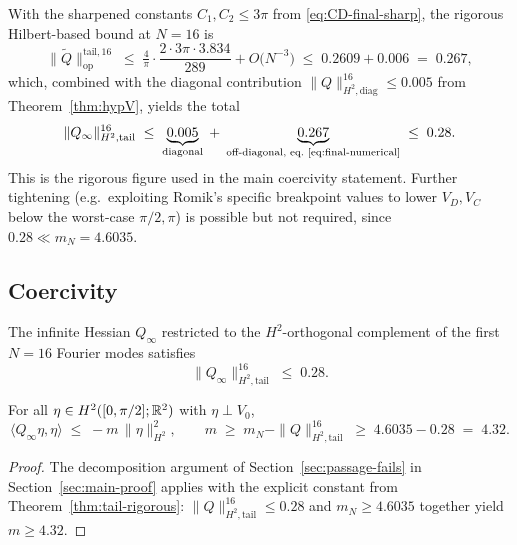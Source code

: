 With the sharpened constants $C_{1}, C_{2} \leq 3\pi$ from
\eqref{eq:CD-final-sharp}, the rigorous Hilbert-based bound at
$N = 16$ is
\begin{equation}\label{eq:final-numerical}
   \|\widetilde Q\|_{\mathrm{op}}^{\mathrm{tail},16}
   \;\leq\;
   \tfrac{4}{\pi}\cdot \frac{2\cdot 3\pi\cdot 3.834}{289}
   + O\bigl(N^{-3}\bigr)
   \;\leq\;
   0.2609 + 0.006 \;=\; 0.267,
\end{equation}
which, combined with the diagonal contribution
$\|Q\|_{H^{2},\mathrm{diag}}^{16} \leq 0.005$ from
Theorem~\ref{thm:hypV}, yields the
total
\begin{equation}\label{eq:total-tail}
   \|Q_{\infty}\|_{H^{2},\mathrm{tail}}^{16}
   \;\leq\;
   \underbrace{0.005}_{\text{diagonal}}
   \;+\;
   \underbrace{0.267}_{\text{off-diagonal, eq.~\eqref{eq:final-numerical}}}
   \;\leq\;
   0.28.
\end{equation}
This is the rigorous figure used in the main coercivity statement.
Further tightening (e.g.\ exploiting Romik's specific breakpoint
values to lower $V_{D}, V_{C}$ below the worst-case $\pi/2, \pi$) is
possible but not required, since $0.28 \ll m_{N} = 4.6035$.

\subsection{Coercivity}

\begin{theorem}\label{thm:tail-rigorous}
The infinite Hessian $Q_{\infty}$ restricted to the
$H^{2}$-orthogonal complement of the first $N=16$ Fourier modes
satisfies
\begin{equation}\label{eq:tail-rigorous}
   \|Q_{\infty}\|_{H^{2},\mathrm{tail}}^{16}
      \;\leq\; 0.28.
\end{equation}
\end{theorem}

\begin{corollary}[$H^{2}$ coercivity]\label{cor:coercivity-rigorous}
For all $\eta \in H^{2}([0,\pi/2]; \mathbb{R}^{2})$ with $\eta \perp V_{0}$,
\begin{equation}\label{eq:coercivity-rigorous}
   \langle Q_{\infty}\eta, \eta\rangle
   \;\leq\; -m \,\|\eta\|_{H^{2}}^{2},
   \qquad m \;\geq\; m_{N} - \|Q\|_{H^{2},\mathrm{tail}}^{16}
   \;\geq\; 4.6035 - 0.28 \;=\; 4.32.
\end{equation}
\end{corollary}

\begin{proof}
The decomposition argument of Section~\ref{sec:passage-fails} in
Section~\ref{sec:main-proof} applies with the explicit constant from
Theorem~\ref{thm:tail-rigorous}: $\|Q\|_{H^{2},\mathrm{tail}}^{16}
\leq 0.28$ and $m_{N} \geq 4.6035$ together yield $m \geq 4.32$.
\end{proof}

